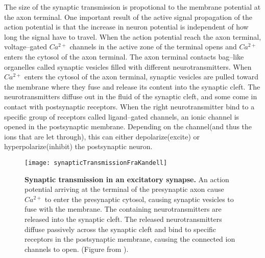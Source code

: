 		The size of the synaptic transmission is propotional to the membrane potential at the axon terminal.
		One important result of the active signal propagation of the action potential is that the increase in neuron potential is independent of how long the signal have to travel.
		When the action potential reach the axon terminal, voltage--gated $Ca^{2+}$ channels in the active zone of the terminal opens and $Ca^{2+}$ enters the cytosol of the axon terminal. %
		The axon terminal contacts bag--like organelles called synaptic vesicles filled with different neurotransmitters.
		When $Ca^{2+}$ enters the cytosol of the axon terminal, synaptic vesicles are pulled toward the membrane where they fuse and release its content into the synaptic cleft.
		The neurotransmitters diffuse out in the fluid of the synaptic cleft, and some come in contact with postsynaptic receptors. %
		When the right neurotransmitter bind to a specific group of receptors called ligand--gated channels, an ionic channel is opened in the postsynaptic membrane.
		Depending on the channel(and thus the ions that are let through), this can either depolarize(excite) or hyperpolarize(inhibit) the postsynaptic neuron.
		\cite{PrinciplesOfNeuralScience4edKAP10}
		


\begin{figure}[hbt!p]
    \centering
    \texttt{[image: synapticTransmissionFraKandell]}	%
 	  \caption{\textbf{Synaptic transmission in an excitatory synapse.} 
			An action potential arriving at the terminal of the presynaptic axon cause $Ca^{2+}$ to enter the presynaptic cytosol, causing synaptic vesicles to fuse with the membrane.
			The containing neurotransmitters are released into the synaptic cleft.
			The released neurotransmitters diffuse passively across the synaptic cleft and bind to specific receptors in the postsynaptic membrane, causing the connected ion channels to open.
			(Figure from \cite{PrinciplesOfNeuralScience4edKAP10}).
			}
    \label{figActionPotential}
\end{figure}

